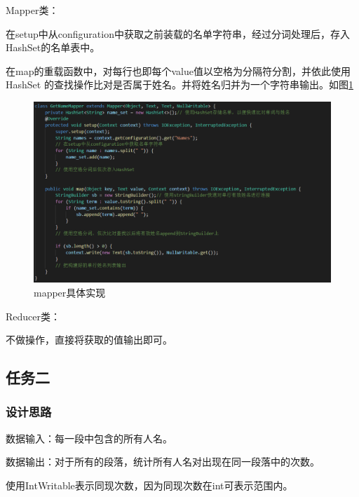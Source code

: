 \documentclass[a4paper,UTF8]{article}
\numberwithin{equation}{section}
\begin{document}
\par Mapper类：
\par 在setup中从configuration中获取之前装载的名单字符串，经过分词处理后，存入HashSet的名单表中。
\par 在map的重载函数中，对每行也即每个value值以空格为分隔符分割，并依此使用HashSet 的查找操作比对是否属于姓名。并将姓名归并为一个字符串输出。如图\ref{task1-mapper}
\begin{figure}[htbp]
    \centering
    \includegraphics[width = 15cm]{task1-mapper.png}
    \caption{mapper具体实现}
    \label{task1-mapper}
\end{figure}

\par Reducer类：
\par 不做操作，直接将获取的值输出即可。

\subsection{任务二}
\subsubsection{设计思路}
\par 数据输入：每一段中包含的所有人名。
\par 数据输出：对于所有的段落，统计所有人名对出现在同一段落中的次数。
\par 使用IntWritable表示同现次数，因为同现次数在int可表示范围内。
\end{document}
